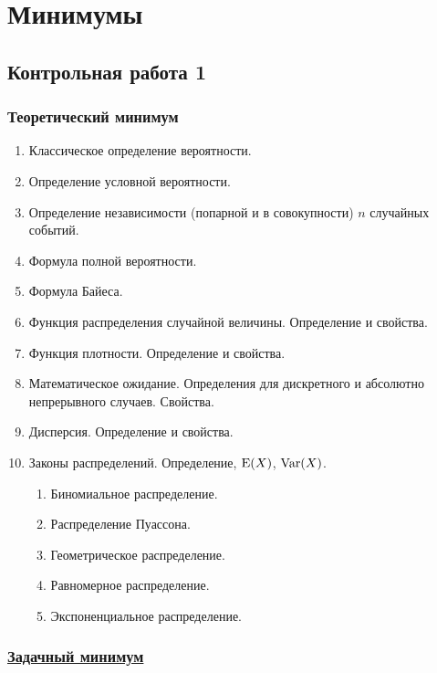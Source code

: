 \newpage
\thispagestyle{empty}
\section{Минимумы}

\subsection{Контрольная работа 1}

\subsubsection*{Теоретический минимум}


\begin{enumerate}
	\item Классическое определение вероятности.
	\item Определение условной вероятности.
	\item Определение независимости (попарной и в совокупности) $n$ случайных событий.
	\item Формула полной вероятности.
	\item Формула Байеса.
	\item Функция распределения случайной величины. Определение и свойства.
	\item Функция плотности. Определение и свойства.
	\item Математическое ожидание. Определения для дискретного и абсолютно непрерывного случаев. Свойства.
	\item Дисперсия. Определение и свойства.
	\item Законы распределений. Определение, $\operatorname{E}(X)$, $\operatorname{Var}(X)$.
	\begin{enumerate}
	\item Биномиальное распределение.
	\item Распределение Пуассона.
	\item Геометрическое распределение.
	\item Равномерное распределение.
	\item Экспоненциальное распределение.
	\end{enumerate}
\end{enumerate}

\newpage
\subsubsection*{\hyperref[sec:sol_minimum_kr_01]{Задачный минимум}}\label{sec:minimum_kr_01}

